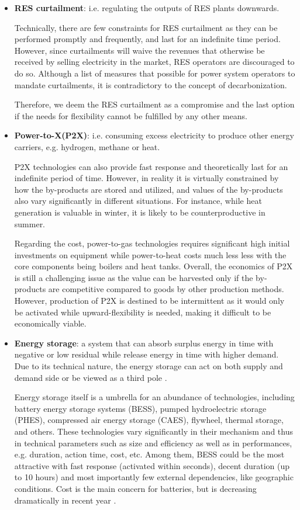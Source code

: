 \begin{itemize}
	\item \textbf{RES curtailment}: i.e. regulating the outputs of RES plants downwards.
	
	Technically, there are few constraints for RES curtailment as they can be performed promptly and frequently, and last for an indefinite time period. However, since curtailments will waive the revenues that otherwise be received by selling electricity in the market, RES operators are discouraged to do so. Although a list of measures that possible for power system operators to mandate curtailments, it is contradictory to the concept of decarbonization. 
	
	Therefore, we deem the RES curtailment as a compromise and the last option if the needs for flexibility cannot be fulfilled by any other means.
	
	\item \textbf{Power-to-X(P2X)}: i.e. consuming excess electricity to produce other energy carriers, e.g. hydrogen, methane or heat.
	
	P2X technologies can also provide fast response and theoretically last for an indefinite period of time. However, in reality it is virtually constrained by how the by-products are stored and utilized, and values of the by-products also vary significantly in different situations. For instance, while heat generation is valuable in winter, it is likely to be counterproductive in summer. 
	
	Regarding the cost, power-to-gas technologies requires significant high initial investments on equipment while power-to-heat costs much less less with the core components being boilers and heat tanks. Overall, the economics of P2X is still a challenging issue as the value can be harvested only if the by-products are competitive compared to goods by other production methods. However, production of P2X is destined to be intermittent as it would only be activated while upward-flexibility is needed, making it difficult to be economically viable.
	
	\item \textbf{Energy storage}: a system that can absorb surplus energy in time with negative or low residual while release energy in time with higher demand. Due to its technical nature, the energy storage can act on both supply and demand side or be viewed as a third pole \cite{Gunter2016}.
	
	Energy storage itself is a umbrella for an abundance of technologies, including battery energy storage systems (BESS), pumped hydroelectric storage (PHES), compressed air energy storage (CAES), flywheel, thermal storage, and others. These technologies vary significantly in their mechanism and thus in technical parameters such as size and efficiency as well as in performances, e.g. duration, action time, cost, etc. Among them, BESS could be the most attractive with fast response (activated within seconds), decent duration (up to 10 hours) and most importantly few external dependencies, like geographic conditions. Cost is the main concern for batteries, but is decreasing dramatically in recent year \cite{Nykvist2015}.
	

\end{itemize}
